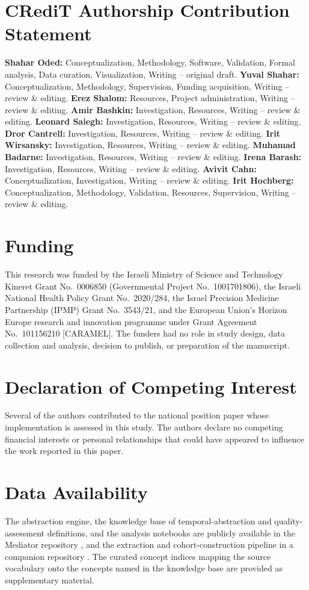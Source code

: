 \documentclass[preprint,12pt]{elsarticle}
\begin{document}
\section*{CRediT Authorship Contribution Statement}
\textbf{Shahar Oded:} Conceptualization, Methodology, Software, Validation,
Formal analysis, Data curation, Visualization, Writing -- original draft.
\textbf{Yuval Shahar:} Conceptualization, Methodology, Supervision, Funding
acquisition, Writing -- review \& editing.
\textbf{Erez Shalom:} Resources, Project administration, Writing -- review \&
editing.
\textbf{Amir Bashkin:} Investigation, Resources, Writing -- review \& editing.
\textbf{Leonard Saiegh:} Investigation, Resources, Writing -- review \& editing.
\textbf{Dror Cantrell:} Investigation, Resources, Writing -- review \& editing.
\textbf{Irit Wirsansky:} Investigation, Resources, Writing -- review \& editing.
\textbf{Muhamad Badarne:} Investigation, Resources, Writing -- review \& editing.
\textbf{Irena Barash:} Investigation, Resources, Writing -- review \& editing.
\textbf{Avivit Cahn:} Conceptualization, Investigation, Writing -- review \&
editing.
\textbf{Irit Hochberg:} Conceptualization, Methodology, Validation,
Resources, Supervision, Writing -- review \& editing.

\section*{Funding}
This research was funded by the Israeli Ministry of Science and Technology
Kineret Grant No.~0006850 (Governmental Project No.~1001701806), the Israeli
National Health Policy Grant No.~2020/284, the Israel Precision Medicine
Partnership (IPMP) Grant No.~3543/21, and the European Union's Horizon Europe
research and innovation programme under Grant Agreement No.~101156210
[CARAMEL]. The funders had no role in study design, data collection and
analysis, decision to publish, or preparation of the manuscript.

\section*{Declaration of Competing Interest}
Several of the authors contributed to the national position paper whose
implementation is assessed in this study. The authors declare no competing
financial interests or personal relationships that could have appeared to
influence the work reported in this paper.

\section*{Data Availability}
The abstraction engine, the knowledge base of temporal-abstraction and
quality-assessment definitions, and the analysis notebooks are publicly
available in the Mediator repository \citep{mediator-github}, and the
extraction and cohort-construction pipeline in a companion repository
\citep{kineret-etl-github}. The curated concept indices mapping the source
vocabulary onto the concepts named in the knowledge base are provided as
supplementary material.
\end{document}
